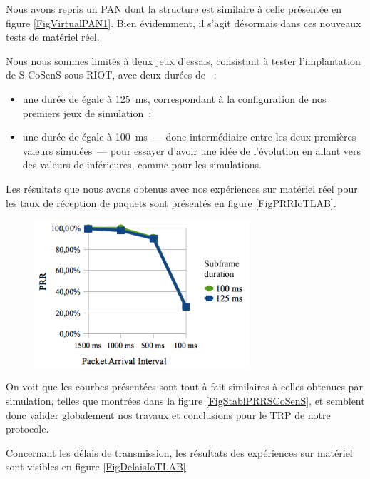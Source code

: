 Nous avons repris un PAN dont la structure est similaire à celle présentée
en figure \vref{FigVirtualPAN1}. Bien évidemment, il s'agit désormais
dans ces nouveaux tests de matériel réel.

Nous nous sommes limités à deux jeux d'essais, consistant à tester
l'implantation de S-CoSenS sous RIOT, avec deux durées de ~:
\begin{itemize}
\item une durée de  égale à 125~ms, correspondant à la
configuration de nos premiers jeux de simulation~;
\item une durée de  égale à 100~ms~--- donc intermédiaire
entre les deux premières valeurs simulées~--- pour essayer d'avoir une
idée de l'évolution en allant vers des valeurs de 
inférieures, comme pour les simulations.
\end{itemize}

Les résultats que nous avons obtenus avec nos expériences sur matériel
réel pour les taux de réception de paquets sont présentés en figure
\vref{FigPRRIoTLAB}.

\begin{figure}[htb]
\centering
\includegraphics[width=8cm]{images/ch5-trp-iot-lab.png}
\label{FigPRRIoTLAB}
\end{figure}

On voit que les courbes présentées sont tout à fait similaires
à celles obtenues par simulation, telles que montrées dans la figure
\vref{FigStablPRRSCoSenS}, et semblent donc valider globalement
nos travaux et conclusions pour le TRP de notre protocole.

\smallskip

Concernant les délais de transmission, les résultats des expériences
sur matériel sont visibles en figure \vref{FigDelaisIoTLAB}.

